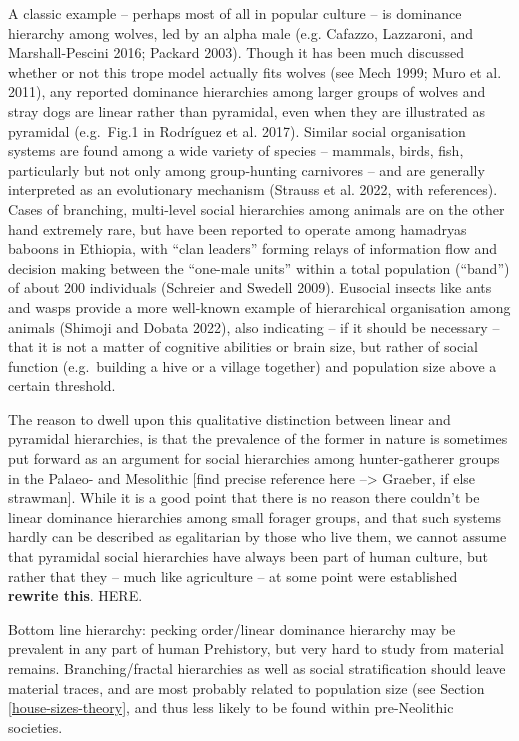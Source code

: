 \documentclass[
  12pt,
]{book}
\begin{document}
A classic example -- perhaps most of all in popular culture -- is dominance hierarchy among wolves, led by an alpha male (e.g. Cafazzo, Lazzaroni, and Marshall-Pescini 2016; Packard 2003). Though it has been much discussed whether or not this trope model actually fits wolves (see Mech 1999; Muro et al. 2011), any reported dominance hierarchies among larger groups of wolves and stray dogs are linear rather than pyramidal, even when they are illustrated as pyramidal (e.g.~Fig.1 in Rodríguez et al. 2017). Similar social organisation systems are found among a wide variety of species -- mammals, birds, fish, particularly but not only among group-hunting carnivores -- and are generally interpreted as an evolutionary mechanism (Strauss et al. 2022, with references). Cases of branching, multi-level social hierarchies among animals are on the other hand extremely rare, but have been reported to operate among hamadryas baboons in Ethiopia, with ``clan leaders'' forming relays of information flow and decision making between the ``one-male units'' within a total population (``band'') of about 200 individuals (Schreier and Swedell 2009). Eusocial insects like ants and wasps provide a more well-known example of hierarchical organisation among animals (Shimoji and Dobata 2022), also indicating -- if it should be necessary -- that it is not a matter of cognitive abilities or brain size, but rather of social function (e.g.~building a hive or a village together) and population size above a certain threshold.

The reason to dwell upon this qualitative distinction between linear and pyramidal hierarchies, is that the prevalence of the former in nature is sometimes put forward as an argument for social hierarchies among hunter-gatherer groups in the Palaeo- and Mesolithic {[}find precise reference here --\textgreater{} Graeber, if else strawman{]}. While it is a good point that there is no reason there couldn't be linear dominance hierarchies among small forager groups, and that such systems hardly can be described as egalitarian by those who live them, we cannot assume that pyramidal social hierarchies have always been part of human culture, but rather that they -- much like agriculture -- at some point were established \textbf{rewrite this}. HERE.

Bottom line hierarchy: pecking order/linear dominance hierarchy may be prevalent in any part of human Prehistory, but very hard to study from material remains. Branching/fractal hierarchies as well as social stratification should leave material traces, and are most probably related to population size (see Section \ref{house-sizes-theory}, and thus less likely to be found within pre-Neolithic societies.
\end{document}
